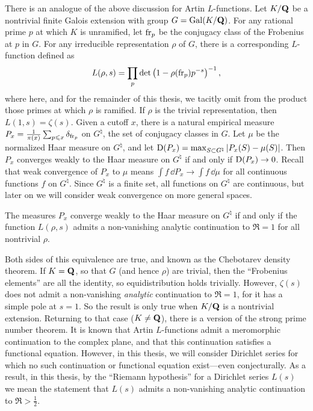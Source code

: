 There is an analogue of the above discussion for Artin $L$-functions. 
Let $K/\mathbf{Q}$ be a nontrivial finite  Galois extension with group 
$G=\operatorname{Gal}(K/\mathbf{Q})$. For any 
rational prime $p$ at which $K$ is unramified, let $\mathrm{fr}_p$ be the conjugacy 
class of the Frobenius at $p$ in $G$. For any irreducible representation 
$\rho$ of $G$, there is a corresponding $L$-function defined as 
\[
	L(\rho,s) = \prod_p \det\left(1-\rho(\mathrm{fr}_p) p^{-s}\right)^{-1} ,
\]
where here, and for the remainder of this thesis, we tacitly omit from the 
product those primes at which $\rho$ is ramified. If $\rho$ is the trivial 
representation, then $L(1,s) = \zeta(s)$. Given a cutoff $x$, there is a 
natural empirical measure 
$P_x = \frac{1}{\pi(x)} \sum_{p\leqslant x} \delta_{\mathrm{fr}_p}$ on $G^\natural$, 
the set of conjugacy classes in $G$. Let $\mu$ be the normalized Haar measure 
on $G^\natural$, and let 
$\operatorname{D}(P_x) = \max_{S\subset G^\natural} \left| P_x(S) - \mu(S)\right|$. 
Then $P_x$ converges weakly to the Haar measure on $G^\natural$ if and 
only if $\operatorname{D}(P_x) \to 0$. Recall that weak convergence of $P_x$ to $\mu$ means 
$\int f\, \dd P_x \to \int f\, \dd\mu$ for all continuous functions $f$ on 
$G^\natural$. Since $G^\natural$ is a finite set, all functions on $G^\natural$ 
are continuous, but later on we will consider weak convergence on more general 
spaces.  

\begin{theorem}
The measures $P_x$ converge weakly to the Haar measure on $G^\natural$ if and 
only if the function $L(\rho,s)$ admits a non-vanishing analytic continuation 
to $\Re = 1$ for all nontrivial $\rho$. 
\end{theorem}

Both sides of this equivalence are true, and known as the Chebotarev density 
theorem. If $K = \mathbf{Q}$, so that $G$ (and hence $\rho$) are trivial, then the 
``Frobenius elements'' are all the identity, so equidistribution holds 
trivially. However, $\zeta(s)$ does not admit a non-vanishing \emph{analytic} 
continuation to $\Re = 1$, for it has a simple pole at $s = 1$. So the 
result is only true when $K/\mathbf{Q}$ is a nontrivial extension. Returning to that 
case ($K\ne \mathbf{Q}$), there is a version of the strong prime number theorem. It is 
known that Artin $L$-functions admit a meromorphic continuation to the complex 
plane, and that this continuation satisfies a functional equation. However, in 
this thesis, we will consider Dirichlet series for which no such continuation 
or functional equation exist---even conjecturally. As a result, in this thesis, 
by the ``Riemann hypothesis'' for a Dirichlet series $L(s)$ we mean the 
statement that $L(s)$ admits a non-vanishing analytic continuation to 
$\Re > \frac 1 2$. 


